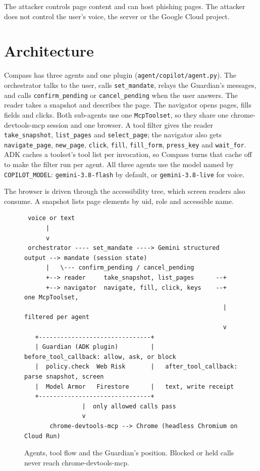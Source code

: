 \documentclass[11pt]{article}
\newcommand{\code}[1]{\texttt{#1}}
\begin{document}
The attacker controls page content and can host phishing pages. The attacker does not control the user's voice, the server or the Google Cloud project.

\section{Architecture}

Compass has three agents and one plugin (\code{agent/copilot/agent.py}). The orchestrator talks to the user, calls \code{set\_mandate}, relays the Guardian's messages, and calls \code{confirm\_pending} or \code{cancel\_pending} when the user answers. The reader takes a snapshot and describes the page. The navigator opens pages, fills fields and clicks. Both sub-agents use one \code{McpToolset}, so they share one chrome-devtools-mcp session and one browser. A tool filter gives the reader \code{take\_snapshot}, \code{list\_pages} and \code{select\_page}; the navigator also gets \code{navigate\_page}, \code{new\_page}, \code{click}, \code{fill}, \code{fill\_form}, \code{press\_key} and \code{wait\_for}. ADK caches a toolset's tool list per invocation, so Compass turns that cache off to make the filter run per agent. All three agents use the model named by \code{COPILOT\_MODEL}: \code{gemini-3.8-flash} by default, or \code{gemini-3.8-live} for voice.

The browser is driven through the accessibility tree, which screen readers also consume. A snapshot lists page elements by uid, role and accessible name.

\begin{figure}[ht]
\centering
\footnotesize
\begin{verbatim}
 voice or text
      |
      v
 orchestrator ---- set_mandate ----> Gemini structured output --> mandate (session state)
      |   \--- confirm_pending / cancel_pending
      +--> reader     take_snapshot, list_pages      --+
      +--> navigator  navigate, fill, click, keys    --+  one McpToolset,
                                                       |  filtered per agent
                                                       v
   +-------------------------------+
   | Guardian (ADK plugin)         |   before_tool_callback: allow, ask, or block
   |  policy.check  Web Risk       |   after_tool_callback: parse snapshot, screen
   |  Model Armor   Firestore      |   text, write receipt
   +-------------------------------+
                |  only allowed calls pass
                v
       chrome-devtools-mcp --> Chrome (headless Chromium on Cloud Run)
\end{verbatim}
\caption{Agents, tool flow and the Guardian's position. Blocked or held calls never reach chrome-devtools-mcp.}
\label{fig:arch}
\end{figure}
\end{document}
